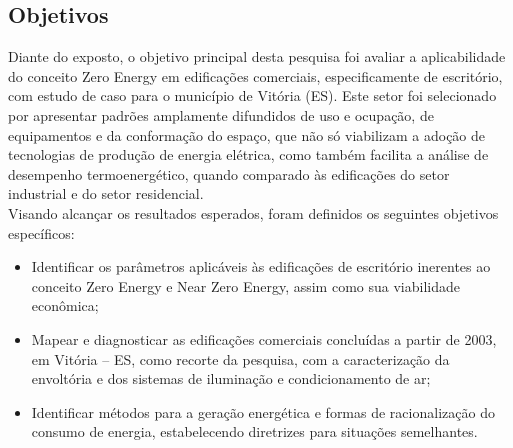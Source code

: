\subsection{Objetivos}
Diante do exposto, o objetivo principal desta pesquisa foi avaliar 
a aplicabilidade do conceito Zero Energy  em  edificações  comerciais,  
especificamente  de  escritório,  com  estudo  de  caso  para  o 
município  de  Vitória  (ES).  Este  setor  foi  selecionado  por  
apresentar  padrões  amplamente difundidos  de  uso  e  ocupação,  
de  equipamentos  e  da  conformação  do  espaço,  que  não  
só viabilizam  a  adoção  de  tecnologias  de  produção  de  energia  
elétrica,  como  também  facilita  a análise de desempenho termoenergético, 
quando comparado às edificações do setor industrial e do setor residencial.\\
Visando alcançar os resultados esperados, foram definidos os seguintes 
objetivos específicos:
\begin{itemize}
    \item Identificar os parâmetros aplicáveis às edificações de escritório 
    inerentes ao conceito Zero Energy e Near Zero Energy, assim como sua 
    viabilidade econômica;
    \item Mapear e diagnosticar as edificações comerciais concluídas a partir 
    de 2003, em Vitória – ES,  como  recorte  da  pesquisa,  com  a  
    caracterização  da  envoltória  e  dos  sistemas  de iluminação e 
    condicionamento de ar;
    \item Identificar métodos para a geração energética e formas de 
    racionalização do consumo de energia, estabelecendo diretrizes para 
    situações semelhantes.
\end{itemize}